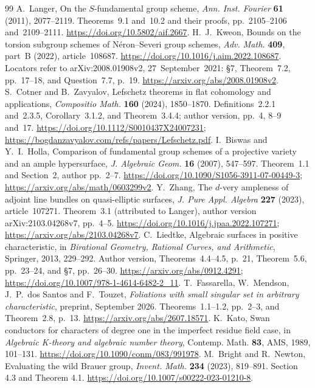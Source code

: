 \documentclass[11pt]{article}
\theoremstyle{remark}\newtheorem{remark}[theorem]{Remark}
\begin{document}
\begin{thebibliography}{99}
A.~Langer, On the $S$-fundamental group scheme,
\emph{Ann. Inst. Fourier} \textbf{61} (2011), 2077--2119.
Theorems~9.1 and~10.2 and their proofs, pp.~2105--2106 and~2109--2111.
\url{https://doi.org/10.5802/aif.2667}.
H.~J.~Kweon, Bounds on the torsion subgroup schemes of
N\'eron--Severi group schemes,
\emph{Adv. Math.} \textbf{409}, part~B (2022), article~108687.
\url{https://doi.org/10.1016/j.aim.2022.108687}.
Locators refer to arXiv:2008.01908v2, 27~September~2021:
\S7, Theorem~7.2, pp.~17--18, and Question~7.7, p.~19.
\url{https://arxiv.org/abs/2008.01908v2}.
S.~Cotner and B.~Zavyalov, Lefschetz theorems in flat cohomology
and applications, \emph{Compositio Math.} \textbf{160} (2024),
1850--1870. Definitions~2.2.1 and~2.3.5, Corollary~3.1.2, and
Theorem~3.4.4;
author version, pp.~4, 8--9 and~17.
\url{https://doi.org/10.1112/S0010437X24007231};
\url{https://bogdanzavyalov.com/refs/papers/Lefschetz.pdf}.
I.~Biswas and Y.~I.~Holla, Comparison of fundamental group schemes
of a projective variety and an ample hypersurface,
\emph{J. Algebraic Geom.} \textbf{16} (2007), 547--597.
Theorem~1.1 and Section~2, author pp.~2--7.
\url{https://doi.org/10.1090/S1056-3911-07-00449-3};
\url{https://arxiv.org/abs/math/0603299v2}.
Y.~Zhang, The $d$-very ampleness of adjoint line bundles on
quasi-elliptic surfaces, \emph{J. Pure Appl. Algebra} \textbf{227}
(2023), article~107271. Theorem~3.1 (attributed to Langer),
author version arXiv:2103.04268v7, pp.~4--5.
\url{https://doi.org/10.1016/j.jpaa.2022.107271};
\url{https://arxiv.org/abs/2103.04268v7}.
 C.~Liedtke, Algebraic surfaces in positive characteristic, in \emph{Birational Geometry, Rational Curves, and Arithmetic}, Springer, 2013, 229--292. Author version, Theorems~4.4--4.5, p.~21, Theorem~5.6, pp.~23--24, and \S7, pp.~26--30. \url{https://arxiv.org/abs/0912.4291}; \url{https://doi.org/10.1007/978-1-4614-6482-2_11}.
 T.~Fassarella, W.~Mendson, J.~P.~dos Santos and F.~Touzet, \emph{Foliations with small singular set in arbitrary characteristic}, preprint, September 2026. Theorems~1.1--1.2, pp.~2--3, and Theorem~2.8, p.~13. \url{https://arxiv.org/abs/2607.18571}.
 K.~Kato, Swan conductors for characters of degree one in the imperfect residue field case, in \emph{Algebraic K-theory and algebraic number theory}, Contemp. Math. \textbf{83}, AMS, 1989, 101--131. \url{https://doi.org/10.1090/conm/083/991978}.
 M.~Bright and R.~Newton, Evaluating the wild Brauer group, \emph{Invent. Math.} \textbf{234} (2023), 819--891. Section 4.3 and Theorem 4.1. \url{https://doi.org/10.1007/s00222-023-01210-8}.

\end{thebibliography}
\end{document}
